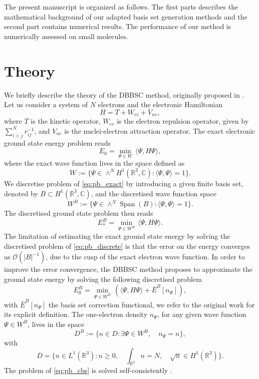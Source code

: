 \documentclass[a4paper,11pt]{article}
\DeclareMathOperator{\Span}{Span}
\begin{document}
The present manuscript is organized as follows. The first parts describes the
mathematical background of our adapted basis set generation methods and the
second part contains numerical results. The performance of 
our method is numerically assessed on small molecules.

\section{Theory}

We briefly describe the theory of the DBBSC method, 
originally proposed in \cite{giner2018curing}. 
Let us consider a system of $N$ electrons and the electronic Hamiltonian
\[
    H = T + W_{ee} + V_{ne},
\]
where $T$ is the kinetic operator, $W_{ee}$ is the
electron repulsion operator, given by $\sum_{i<j}^Nr_{ij}^{-1}$, and $V_{ne}$ 
is the nuclei-electron attraction operator. The exact electronic ground state
energy problem reads
\begin{equation}
    \label{eq:pb_exact}
    E_0 = \min_{\Psi\in W}\,\langle \Psi,H\Psi\rangle,
\end{equation}
where the exact wave function lives in the space defined as
\[
    W := \{\Psi\in\wedge^N H^1(\mathbb R^3,\mathbb C)\colon \langle
    \Psi,\Psi\rangle=1\}.
\]
We discretise problem of \cref{eq:pb_exact} by introducing a given finite basis
set, denoted by $B\subset H^1(\mathbb R^3,\mathbb C)$, and the discretised wave
function space
\[
    W^B := \{\Psi\in\wedge^N \Span(B)\colon \langle\Psi,\Psi\rangle=1\}.
\]
The discretised ground state problem then reads
\begin{equation}
    \label{eq:pb_discrete}
    E_*^B = \min_{\Psi\in W^B}\,\langle \Psi, H\Psi\rangle.
\end{equation}
The limitation of estimating the exact ground state energy by solving 
the discretised problem of \cref{eq:pb_discrete} is that the 
error on the energy converges as $\mathcal O(|B|^{-1})$, due to the cusp of the
exact electron wave function. In order to improve the error convergence, the DBBSC method 
proposes to approximate the ground state energy by solving the following discretised problem
\begin{equation}
    \label{eq:pb_cbs}
    E_0^B = \min_{\Psi\in W^B}\, \left(\langle\Psi, H\Psi\rangle +
    \bar E^B[n_{\Psi}]\right),
\end{equation}
with $\bar E^B[n_{\Psi}]$ the basis set correction functional, we refer 
to the original work for its explicit definition.  
The one-electron density $n_{\Psi}$, for any given wave 
function $\Psi\in W^B$, lives in the space
\[
    D^B := \{n\in D\colon \exists \Psi\in W^B, \quad n_{\Psi}=n\},
\]
with 
\[
    D= \{n\in L^1(\mathbb R^3)\colon n\geq 0, \quad \int_{\mathbb R^3} 
    n=N, \quad \sqrt{n}\in H^1(\mathbb R^3)\}.
\]
The problem of \cref{eq:pb_cbs} is solved self-consistently 
\cite{giner2021self}.
\end{document}
